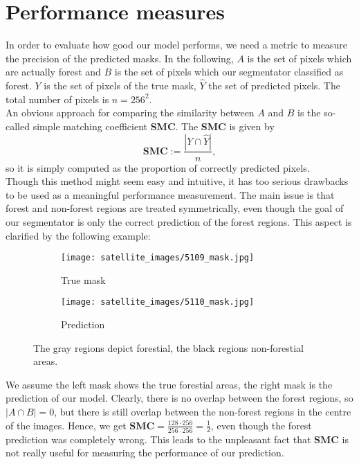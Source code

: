 \section{Performance measures}
In order to evaluate how good our model performs, we need a metric to measure the precision of the predicted masks. 
In the following, $A$ is the set of pixels which are actually forest and $B$ is the set of pixels which our segmentator classified as forest. $Y$ is the set of pixels of the true mask, $\hat{Y}$ the set of predicted pixels. The total number of pixels is $n=256^2$.\\
An obvious approach for comparing the similarity between $A$ and $B$ is the so-called simple matching coefficient \textbf{SMC}. The \textbf{SMC} is given by
\begin{equation}
	\textbf{SMC}:=\frac{|Y\cap \hat{Y}|}{n},
\end{equation} 
so it is simply computed as the proportion of correctly predicted pixels.\\
Though this method might seem easy and intuitive, it has too serious drawbacks to be used as a meaningful performance measurement. The main issue is that forest and non-forest regions are treated symmetrically, even though the goal of our segmentator is only the correct prediction of the forest regions. This aspect is clarified by the following example: 

\begin{figure}[h]
	\centering
	\begin{subfigure}{.5\textwidth}
		\centering
		\texttt{[image: satellite\_images/5109\_mask.jpg]}
		\caption{True mask}
		\label{fig:sub1}
	\end{subfigure}%
	\begin{subfigure}{.5\textwidth}
		\centering
		\texttt{[image: satellite\_images/5110\_mask.jpg]}
		\caption{Prediction}
		\label{fig:sub2}
	\end{subfigure}
	\caption{The gray regions depict forestial, the black regions non-forestial areas. }
	\label{fig:test}
\end{figure}
We assume the left mask shows the true forestial areas, the right mask is the prediction of our model. Clearly, there is no overlap between the forest regions, so $|A \cap B| = 0$, but there is still overlap between the non-forest regions in the centre of the images. Hence, we get $\textbf{SMC}=\frac{128\cdot 256}{256 \cdot 256}=\frac{1}{2}$, even though the forest prediction was completely wrong. This leads to the unpleasant fact that $\textbf{SMC}$ is not really useful for measuring the performance of our prediction.\\


